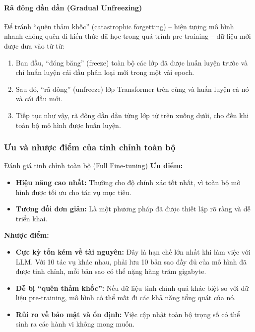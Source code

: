 \paragraph{Rã đông dần dần (Gradual Unfreezing)}
Để tránh “quên thảm khốc” (catastrophic forgetting) -- hiện tượng mô hình nhanh chóng quên đi kiến thức đã học trong quá trình pre-training -- dữ liệu mới được đưa vào từ từ:
\begin{enumerate}
    \item Ban đầu, “đóng băng” (freeze) toàn bộ các lớp đã được huấn luyện trước và chỉ huấn luyện cái đầu phân loại mới trong một vài epoch.
    \item Sau đó, “rã đông” (unfreeze) lớp Transformer trên cùng và huấn luyện cả nó và cái đầu mới.
    \item Tiếp tục như vậy, rã đông dần dần từng lớp từ trên xuống dưới, cho đến khi toàn bộ mô hình được huấn luyện.
\end{enumerate}

\subsubsection{Ưu và nhược điểm của tinh chỉnh toàn bộ}
\begin{assess}{Đánh giá tinh chỉnh toàn bộ (Full Fine-tuning)}
\textbf{Ưu điểm:}
\begin{itemize}
    \item \textbf{Hiệu năng cao nhất:} Thường cho độ chính xác tốt nhất, vì toàn bộ mô hình được tối ưu cho tác vụ mục tiêu.
    \item \textbf{Tương đối đơn giản:} Là một phương pháp đã được thiết lập rõ ràng và dễ triển khai.
\end{itemize}
\textbf{Nhược điểm:}
\begin{itemize}
    \item \textbf{Cực kỳ tốn kém về tài nguyên:} Đây là hạn chế lớn nhất khi làm việc với LLM. Với 10 tác vụ khác nhau, phải lưu 10 bản sao đầy đủ của mô hình đã được tinh chỉnh, mỗi bản sao có thể nặng hàng trăm gigabyte.
    \item \textbf{Dễ bị “quên thảm khốc”:} Nếu dữ liệu tinh chỉnh quá khác biệt so với dữ liệu pre-training, mô hình có thể mất đi các khả năng tổng quát của nó.
    \item \textbf{Rủi ro về bảo mật và ổn định:} Việc cập nhật toàn bộ trọng số có thể sinh ra các hành vi không mong muốn.
\end{itemize}
\end{assess}

